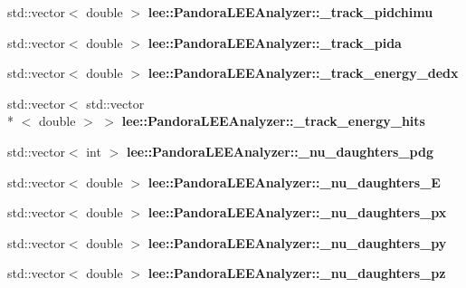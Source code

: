 \begin{DoxyCompactItemize}
\item 
\hypertarget{group__lee_ga92b6e7aa446dda4b3fb5ef6a523417d3}{std\-::vector$<$ double $>$ {\bfseries lee\-::\-Pandora\-L\-E\-E\-Analyzer\-::\-\_\-track\-\_\-pidchimu}}\label{group__lee_ga92b6e7aa446dda4b3fb5ef6a523417d3}

\item 
\hypertarget{group__lee_ga51862c538bdadd1819aa4cc47f37daab}{std\-::vector$<$ double $>$ {\bfseries lee\-::\-Pandora\-L\-E\-E\-Analyzer\-::\-\_\-track\-\_\-pida}}\label{group__lee_ga51862c538bdadd1819aa4cc47f37daab}

\item 
\hypertarget{group__lee_ga548f84dc28b54f42d917780967237fbb}{std\-::vector$<$ double $>$ {\bfseries lee\-::\-Pandora\-L\-E\-E\-Analyzer\-::\-\_\-track\-\_\-energy\-\_\-dedx}}\label{group__lee_ga548f84dc28b54f42d917780967237fbb}

\item 
\hypertarget{group__lee_ga78b31424830aa3c041dbff599185c3bb}{std\-::vector$<$ std\-::vector\\*
$<$ double $>$ $>$ {\bfseries lee\-::\-Pandora\-L\-E\-E\-Analyzer\-::\-\_\-track\-\_\-energy\-\_\-hits}}\label{group__lee_ga78b31424830aa3c041dbff599185c3bb}

\item 
\hypertarget{group__lee_gaaacddd2332477a23f786ee4c854d3e61}{std\-::vector$<$ int $>$ {\bfseries lee\-::\-Pandora\-L\-E\-E\-Analyzer\-::\-\_\-nu\-\_\-daughters\-\_\-pdg}}\label{group__lee_gaaacddd2332477a23f786ee4c854d3e61}

\item 
\hypertarget{group__lee_gac1d71f8ed82068b3a02d9a37905bf195}{std\-::vector$<$ double $>$ {\bfseries lee\-::\-Pandora\-L\-E\-E\-Analyzer\-::\-\_\-nu\-\_\-daughters\-\_\-\-E}}\label{group__lee_gac1d71f8ed82068b3a02d9a37905bf195}

\item 
\hypertarget{group__lee_gaa834071311edb5ffa50db6132496fb95}{std\-::vector$<$ double $>$ {\bfseries lee\-::\-Pandora\-L\-E\-E\-Analyzer\-::\-\_\-nu\-\_\-daughters\-\_\-px}}\label{group__lee_gaa834071311edb5ffa50db6132496fb95}

\item 
\hypertarget{group__lee_ga3e2b79305694205bc16527e7d086058a}{std\-::vector$<$ double $>$ {\bfseries lee\-::\-Pandora\-L\-E\-E\-Analyzer\-::\-\_\-nu\-\_\-daughters\-\_\-py}}\label{group__lee_ga3e2b79305694205bc16527e7d086058a}

\item 
\hypertarget{group__lee_ga838abd41f7c806c0242d1d612e1a3c80}{std\-::vector$<$ double $>$ {\bfseries lee\-::\-Pandora\-L\-E\-E\-Analyzer\-::\-\_\-nu\-\_\-daughters\-\_\-pz}}\label{group__lee_ga838abd41f7c806c0242d1d612e1a3c80}


\end{DoxyCompactItemize}
